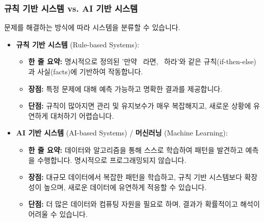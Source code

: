 \documentclass[11pt,a4paper]{article}
\theoremstyle{definition}
\begin{document}
\subsubsection*{규칙 기반 시스템 vs. AI 기반 시스템}
문제를 해결하는 방식에 따라 시스템을 분류할 수 있습니다.
\begin{itemize}
    \item \textbf{규칙 기반 시스템} (Rule-based Systems):
    \begin{itemize}
        \item \textbf{한 줄 요약:} 명시적으로 정의된 '만약 ~라면, ~하라'와 같은 규칙(if-then-else)과 사실(facts)에 기반하여 작동합니다.
        \item \textbf{장점:} 특정 문제에 대해 예측 가능하고 명확한 결과를 제공합니다.
        \item \textbf{단점:} 규칙이 많아지면 관리 및 유지보수가 매우 복잡해지고, 새로운 상황에 유연하게 대처하기 어렵습니다.
    \end{itemize}
    \item \textbf{AI 기반 시스템} (AI-based Systems) / \textbf{머신러닝} (Machine Learning):
    \begin{itemize}
        \item \textbf{한 줄 요약:} 데이터와 알고리즘을 통해 스스로 학습하여 패턴을 발견하고 예측을 수행합니다. 명시적으로 프로그래밍되지 않습니다.
        \item \textbf{장점:} 대규모 데이터에서 복잡한 패턴을 학습하고, 규칙 기반 시스템보다 확장성이 높으며, 새로운 데이터에 유연하게 적응할 수 있습니다.
        \item \textbf{단점:} 더 많은 데이터와 컴퓨팅 자원을 필요로 하며, 결과가 확률적이고 해석이 어려울 수 있습니다.
    \end{itemize}
\end{itemize}
\end{document}
